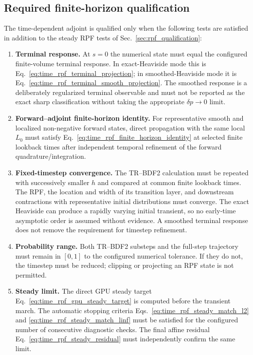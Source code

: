 \documentclass[11pt]{article}
\begin{document}
\subsection{Required finite-horizon qualification}
\label{sec:time_adjoint_qualification}

The time-dependent adjoint is qualified only when the following tests are satisfied in
addition to the steady RPF tests of Sec.~\ref{sec:rpf_qualification}:
\begin{enumerate}
 \item \textbf{Terminal response.}  At $s=0$ the numerical state must equal the configured
       finite-volume terminal response.  In exact-Heaviside mode this is
       Eq.~\eqref{eq:time_rpf_terminal_projection}; in smoothed-Heaviside mode it is
       Eq.~\eqref{eq:time_rpf_terminal_smooth_projection}.  The smoothed response is a
       deliberately regularized terminal observable and must not be reported as the exact sharp
       classification without taking the appropriate $\delta p\rightarrow0$ limit.

 \item \textbf{Forward--adjoint finite-horizon identity.}  For representative smooth and
       localized non-negative forward states, direct propagation with the same local $L_0$ must
       satisfy Eq.~\eqref{eq:time_rpf_finite_horizon_identity} at selected finite lookback times
       after independent temporal refinement of the forward quadrature/integration.

 \item \textbf{Fixed-timestep convergence.}  The TR--BDF2 calculation must be repeated with
       successively smaller $h$ and compared at common finite lookback times.  The RPF, the
       location and width of its transition layer, and downstream contractions with representative
       initial distributions must converge.  The exact Heaviside can produce a rapidly varying
       initial transient, so no early-time asymptotic order is assumed without evidence.  A
       smoothed terminal response does not remove the requirement for timestep refinement.

 \item \textbf{Probability range.}  Both TR--BDF2 substeps and the full-step trajectory must
       remain in $[0,1]$ to the configured numerical tolerance.  If they do not, the timestep
       must be reduced; clipping or projecting an RPF state is not permitted.

 \item \textbf{Steady limit.}  The direct GPU steady target
       Eq.~\eqref{eq:time_rpf_gpu_steady_target} is computed before the transient march.  The
       automatic stopping criteria Eqs.~\eqref{eq:time_rpf_steady_match_l2} and
       \eqref{eq:time_rpf_steady_match_linf} must be satisfied for the configured number of
       consecutive diagnostic checks.  The final affine residual
       Eq.~\eqref{eq:time_rpf_steady_residual} must independently confirm the same limit.


\end{enumerate}
\end{document}
